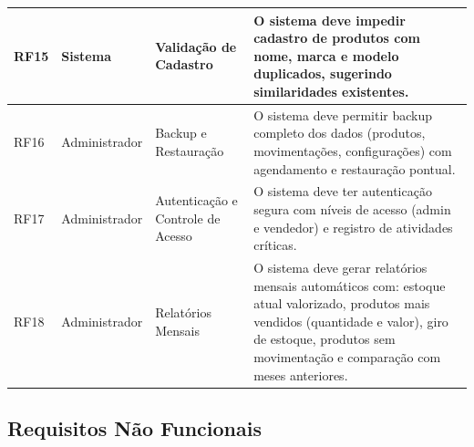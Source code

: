 \documentclass[
	12pt,				%
	openright,			%
	twoside,			%
	a4paper,			%
	english,			%
	french,				%
	spanish,			%
	brazil				%
	]{abntex2}
\begin{document}
\begin{quadro}[htb]
\begin{tabular}{|p{1.0cm}|p{2.8cm}|p{4.2cm}|p{7.0cm}|}
    RF15 & Sistema & Validação de Cadastro & O sistema deve impedir cadastro de produtos com nome, marca e modelo duplicados, sugerindo similaridades existentes. \\ \hline

    RF16 & Administrador & Backup e Restauração & O sistema deve permitir backup completo dos dados (produtos, movimentações, configurações) com agendamento e restauração pontual. \\ \hline

    RF17 & Administrador & Autenticação e Controle de Acesso & O sistema deve ter autenticação segura com níveis de acesso (admin e vendedor) e registro de atividades críticas. \\ \hline

    RF18 & Administrador & Relatórios Mensais & O sistema deve gerar relatórios mensais automáticos com: estoque atual valorizado, produtos mais vendidos (quantidade e valor), giro de estoque, produtos sem movimentação e comparação com meses anteriores. \\ \hline

\end{tabular}
\end{quadro}

\FloatBarrier



\subsection{Requisitos Não Funcionais}
\end{document}

